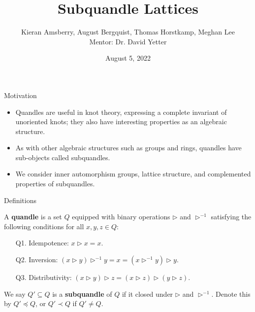 \documentclass[10pt]{beamer}
\title[Subquandle Lattices]{Subquandle Lattices}
\author[Amsberry, Bergquist, Horstkamp, Lee ]{Kieran Amsberry, August Bergquist, Thomas Horstkamp, Meghan Lee \\ \vspace{0.15in} Mentor: Dr. David Yetter}
\institute[ ]{Kansas State University REU}
\date[August 5, 2022]
{August 5, 2022}
\newcommand{\sq}{\preccurlyeq} %
\newcommand{\thru}{\rhd} %
\newcommand{\bthru}{\inv{\thru}} %
\newcommand{\psq}{\prec} %
\newcommand{\inv}[1]{#1^{-1}}
\theoremstyle{plain}
\begin{document}
\frame{\titlepage}

\begin{frame}{Motivation}
\begin{itemize} %
    \item Quandles are useful in knot theory, expressing a complete invariant of unoriented knots; they also have interesting properties as an algebraic structure.
    \vspace{0.25in}
    \item As with other algebraic structures such as groups and rings, quandles have sub-objects called subquandles.%
    \vspace{0.25in}
    \item We consider inner automorphism groups, lattice structure, and complemented properties of subquandles.
\end{itemize}
\end{frame}

\begin{frame}{Definitions} %
    \begin{definition} 
    A \textbf{quandle} is a set $Q$ equipped with binary operations $\thru$ and $\bthru$ satisfying the following conditions for all $x,y,z\in Q$:
    \begin{enumerate}
    \item[Q1.] Idempotence: $x \thru x = x$.
    \pause
    \item[Q2.] Inversion: $(x \thru y) \bthru y = x = (x \bthru y) \thru y$.
    \pause
    \item[Q3.] Distributivity: $(x \thru y)\thru z = (x\thru z)\thru(y\thru z)$.
    \end{enumerate}
   \end{definition}
    \pause
    \vspace{0.2in}
    We say $Q'\subseteq Q$ is a \textbf{subquandle} of $Q$ if it closed under $\thru$ and $\bthru$. Denote this by $Q'\sq Q$, or $Q'\psq Q$ if $Q'\neq Q.$
\end{frame}
\end{document}
